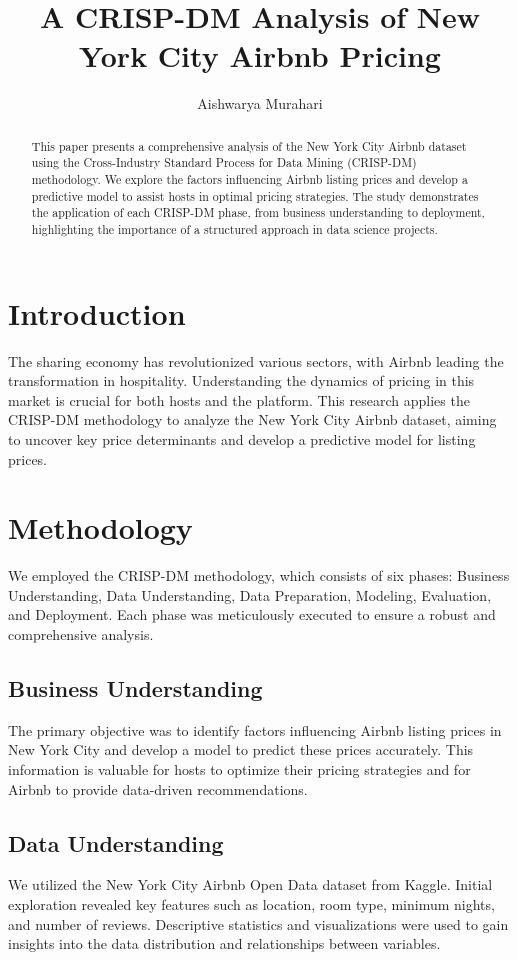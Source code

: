 \documentclass{article}
\title{A CRISP-DM Analysis of New York City Airbnb Pricing}
\author{Aishwarya Murahari}
\date{}
\begin{document}
\maketitle

\begin{abstract}
This paper presents a comprehensive analysis of the New York City Airbnb dataset using the Cross-Industry Standard Process for Data Mining (CRISP-DM) methodology. We explore the factors influencing Airbnb listing prices and develop a predictive model to assist hosts in optimal pricing strategies. The study demonstrates the application of each CRISP-DM phase, from business understanding to deployment, highlighting the importance of a structured approach in data science projects.
\end{abstract}

\section{Introduction}
The sharing economy has revolutionized various sectors, with Airbnb leading the transformation in hospitality. Understanding the dynamics of pricing in this market is crucial for both hosts and the platform. This research applies the CRISP-DM methodology to analyze the New York City Airbnb dataset, aiming to uncover key price determinants and develop a predictive model for listing prices.

\section{Methodology}
We employed the CRISP-DM methodology, which consists of six phases: Business Understanding, Data Understanding, Data Preparation, Modeling, Evaluation, and Deployment. Each phase was meticulously executed to ensure a robust and comprehensive analysis.

\subsection{Business Understanding}
The primary objective was to identify factors influencing Airbnb listing prices in New York City and develop a model to predict these prices accurately. This information is valuable for hosts to optimize their pricing strategies and for Airbnb to provide data-driven recommendations.

\subsection{Data Understanding}
We utilized the New York City Airbnb Open Data dataset from Kaggle. Initial exploration revealed key features such as location, room type, minimum nights, and number of reviews. Descriptive statistics and visualizations were used to gain insights into the data distribution and relationships between variables.
\end{document}
